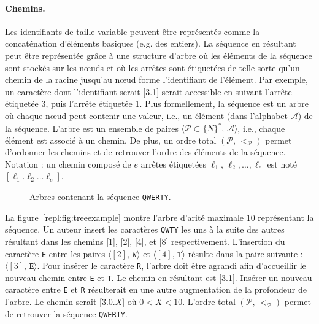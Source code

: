\paragraph{Chemins.}

Les identifiants de taille variable peuvent être représentés comme la
concaténation d'éléments basiques (e.g. des entiers). La séquence en résultant
peut être représentée grâce à une structure d'arbre où les éléments de la
séquence sont stockés sur les nœuds et où les arrêtes sont étiquetées de telle
sorte qu'un chemin de la racine jusqu'au nœud forme l'identifiant de
l'élément. Par exemple, un caractère dont l'identifiant serait [3.1] serait
accessible en suivant l'arrête étiquetée 3, puis l'arrête étiquetée 1. Plus
formellement, la séquence est un arbre où chaque nœud peut contenir une valeur,
i.e., un élément (dans l'alphabet $\mathcal{A}$) de la séquence. L'arbre est un
ensemble de paires $\langle \mathcal{P}\subset \{N\}^*,\, \mathcal{A} \rangle$,
i.e., chaque élément est associé à un chemin. De plus, un ordre total
$(\mathcal{P},\, <_\mathcal{P})$ permet d'ordonner les chemins et de retrouver
l'ordre des éléments de la séquence. Notation : un chemin composé de $e$ arrêtes
étiquetées $\ell_1,\,\ell_2,\ldots,\ell_e$ est noté
$[\ell_1.\ell_2\ldots\ell_e]$.

\begin{figure}
  \centering
  \hspace{20pt}
  \caption{Arbres contenant la séquence \texttt{QWERTY}.}
\end{figure}

La figure~\ref{repl:fig:treeexample} montre l'arbre d'arité maximale 10
représentant la séquence. Un auteur insert les caractères \texttt{QWTY} les uns
à la suite des autres résultant dans les chemins [1], [2], [4], et [8]
respectivement. L'insertion du caractère \texttt{E} entre les paires
$\langle [2],\, \texttt{W} \rangle$ et $\langle [4],\, \texttt{T} \rangle$
résulte dans la paire suivante : $\langle [3],\, \texttt{E} \rangle$. Pour
insérer le caractère \texttt{R}, l'arbre doit être agrandi afin d'accueillir le
nouveau chemin entre \texttt{E} et \texttt{T}. Le chemin en résultant est
[3.1]. Insérer un nouveau caractère entre \texttt{E} et \texttt{R} résulterait
en une autre augmentation de la profondeur de l'arbre. Le chemin serait
[3.0.$X$] où $0<X<10$. L'ordre total $(\mathcal{P},\, <_\mathcal{P})$ permet de
retrouver la séquence \texttt{QWERTY}.


